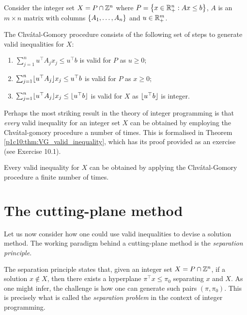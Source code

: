 \begin{definition} \label{p1c10:def:CG-procedure}
	Consider the integer set $X = P \cap \mathbb{Z}^n$ where \lb $P = \left\{ x \in \mathbb{R}^n_+ : Ax \leq b \right \}$, $A$ is an $m \times n$ matrix with columns $\left\{ A_1, \dots, A_n \right \}$ and $u \in \mathbb{R}^m_+$.
	
	The Chv\'atal-Gomory procedure consists of the following set of steps to generate valid inequalities for $X$:
	\begin{enumerate}
	    \item $\sum_{j=1}^n u^\top A_jx_j \leq u^\top b$ is valid for $P$ as $u\geq 0$;
	    \item $\sum_{j=1}^n \lfloor u^\top A_j \rfloor x_j \leq u^\top b$ is valid for $P$ as $x \geq 0$;
	    \item $\sum_{j=1}^n  \lfloor u^\top A_j \rfloor x_j \leq \lfloor u^\top b \rfloor$ is valid for $X$ as $\lfloor u^\top b \rfloor$ is integer.
	\end{enumerate}		
\end{definition}
	
Perhaps the most striking result in the theory of integer programming is that \emph{every} valid inequality for an integer set $X$ can be obtained by employing the Chv\'atal-gomory procedure a number of times. This is formalised in Theorem \ref{p1c10:thm:VG_valid_inequality}, which has its proof provided as an exercise (see Exercise 10.1).

\begin{theorem} \label{p1c10:thm:VG_valid_inequality}
	Every valid inequality for $X$ can be obtained by applying the Chv\'atal-Gomory procedure a finite number of times.
\end{theorem}
	
	
\section{The cutting-plane method}


Let us now consider how one could use valid inequalities to devise a solution method. The working paradigm behind a cutting-plane method is the \emph{separation principle}. 

The separation principle states that, given an integer set $X = P \cap \mathbb{Z}^n$, if a solution $x \notin X$, then there exists a hyperplane $\pi^\top x \leq \pi_0$ separating $x$ and $X$. As one might infer, the challenge is how one can generate such pairs $(\pi, \pi_0)$. This is precisely what is called the \emph{separation problem} in the context of integer programming.

